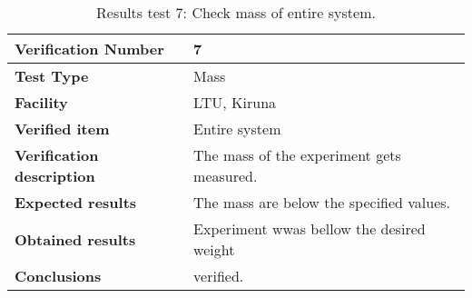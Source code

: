 \begin{table}[H]
\centering

\begin{tabular}{|m{}| m{} |}
\hline
\textbf{Verification Number} 		& 7 				\\ \hline
\textbf{Test Type} 					& Mass 	\\ \hline
\textbf{Facility} 					& LTU, Kiruna 		\\ \hline
\textbf{Verified item} 				& Entire system 	\\ \hline

\textbf{Verification description} 	& The mass of the experiment gets measured. \\ \hline

\textbf{Expected results} 			& The mass are below the specified values. \\ \hline

\textbf{Obtained results} 			& Experiment wwas bellow the desired weight \\ \hline

\textbf{Conclusions} 				&  verified.		\\ \hline
\end{tabular}
\caption{Results test 7: Check mass of entire system.}
\label{tab:testresult7:mass-volume}
\end{table}


\raggedbottom
